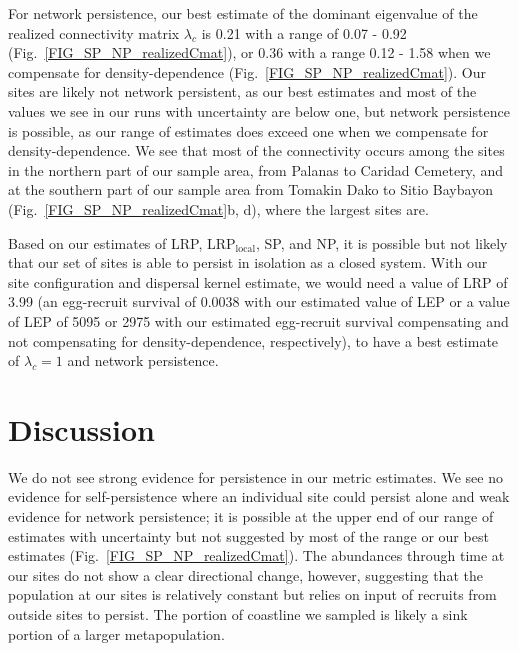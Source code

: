 \documentclass[12pt, oneside]{article}   	%
\begin{document}
For network persistence, our best estimate of the dominant eigenvalue of the realized connectivity matrix $\lambda_c$ is 0.21 with a range of 0.07 - 0.92 (Fig.\ \ref{FIG_SP_NP_realizedCmat}), or 0.36 with a range 0.12 - 1.58 when we compensate for density-dependence (Fig.\ \ref{FIG_SP_NP_realizedCmat}). Our sites are likely not network persistent, as our best estimates and most of the values we see in our runs with uncertainty are below one, but network persistence is possible, as our range of estimates does exceed one when we compensate for density-dependence. We see that most of the connectivity occurs among the sites in the northern part of our sample area, from Palanas to Caridad Cemetery, and at the southern part of our sample area from Tomakin Dako to Sitio Baybayon (Fig.\ \ref{FIG_SP_NP_realizedCmat}b, d), where the largest sites are. 

Based on our estimates of LRP, $\text{LRP}_\text{local}$, SP, and NP, it is possible but not likely that our set of sites is able to persist in isolation as a closed system. With our site configuration and dispersal kernel estimate, we would need a value of LRP of 3.99 (an egg-recruit survival of 0.0038 with our estimated value of LEP or a value of LEP of 5095 or 2975 with our estimated egg-recruit survival compensating and not compensating for density-dependence, respectively), to have a best estimate of $\lambda_c = 1$ and network persistence. 

\section*{Discussion}

We do not see strong evidence for persistence in our metric estimates. We see no evidence for self-persistence where an individual site could persist alone and weak evidence for network persistence; it is possible at the upper end of our range of estimates with uncertainty but not suggested by most of the range or our best estimates (Fig.\ \ref{FIG_SP_NP_realizedCmat}). The abundances through time at our sites do not show a clear directional change, however, suggesting that the population at our sites is relatively constant but relies on input of recruits from outside sites to persist. The portion of coastline we sampled is likely a sink portion of a larger metapopulation. 
\end{document}
